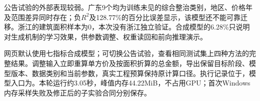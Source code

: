 公告试验的外部表现较弱。广东9个均为训练未见的综合整治类别，地区、价格年及范围差异同时存在；负$R^2$及128.77\%的百分比误差显示，该模型还不能可靠迁移。浙江的建筑面积样本为0，本次没有浙江独立验证。合成模型的6.28\%只说明对生成机制的学习效果，供参数调整、权重读回和前向推理演示。

网页默认使用七指标合成模型；可切换公告试验，查看相同测试集上四种方法的完整结果。调整输入立即重算单方价及按面积折算的总金额，导出保留目标阶段、模型版本、数据类别和当前参数，真实工程预算保持原计算口径。执行记录位于，模型入口为。本轮运行约3.05秒，峰值内存44.22MiB，不占用GPU；首次Windows内存采样失败及修正后的子实验合同分别保存。
